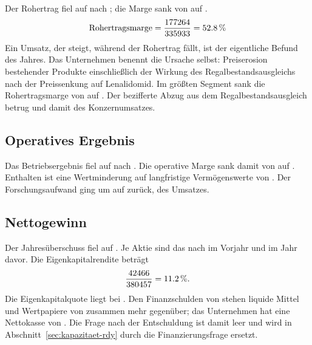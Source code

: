 Der Rohertrag fiel auf \MioINR{\RdyRohertragXXVI} nach
\MioINR{\RdyRohertragXXV}; die Marge sank von \Pct{\RdyRohertragsmargeVJ} auf
\Pct{\RdyRohertragsmarge}.
\[
  \text{Rohertragsmarge} = \frac{\RdyRohertragXXVI}{\RdyUmsatzXXVI}
  = \Pct{\RdyRohertragsmarge}
\]
Ein Umsatz, der steigt, w\"ahrend der Rohertrag f\"allt, ist der eigentliche
Befund des Jahres. Das Unternehmen benennt die Ursache selbst: Preiserosion
bestehender Produkte einschlie{\ss}lich der Wirkung des
Regalbestandsausgleichs nach der Preissenkung auf
Lenalidomid.
Im gr\"o{\ss}ten Segment sank die Rohertragsmarge von
\Pct{\RdyRohertragGgMargeVJ} auf \Pct{\RdyRohertragGgMarge}.
Der bezifferte Abzug aus dem Regalbestandsausgleich betrug
\MioINR{\RdySsaEffekt} und damit \Pct{\RdySsaAnteil} des
Konzernumsatzes.

\subsection{Operatives Ergebnis}

Das Betriebsergebnis fiel \PctBetrag{\RdyBetriebsergebnisWachstum} auf
\MioINR{\RdyBetriebsergebnis} nach
\MioINR{\RdyBetriebsergebnisVJ}.
Die operative Marge sank damit von \Pct{\RdyBetriebsMargeVJ} auf
\Pct{\RdyBetriebsMarge}. Enthalten ist eine Wertminderung auf langfristige
Verm\"ogenswerte von \MioINR{\RdyWertminderung}.
Der Forschungsaufwand ging um \PctBetrag{\RdyForschungWachstum} auf
\MioINR{\RdyForschungXXVI} zur\"uck, \Pct{\RdyForschungsquote} des
Umsatzes.

\subsection{Nettogewinn}

Der Jahres\"uberschuss fiel \PctBetrag{\RdyErgebnisWachstum} auf
\MioINR{\RdyJahresueberschussXXVI}.
Je Aktie sind das \INRje{\RdyErgebnisJeAktie} nach
\INRje{\RdyErgebnisJeAktieVJ} im Vorjahr und
\INRje{\RdyErgebnisJeAktieVVJ} im Jahr davor.
Die Eigenkapitalrendite betr\"agt
\[
  \frac{\RdyJahresueberschussXXVI}{\RdyEigenkapital} = \Pct{\RdyEigenkapitalrendite}.
\]
Die Eigenkapitalquote liegt bei \Pct{\RdyEigenkapitalquote}. Den
Finanzschulden von \MioINR{\RdyFinanzschulden} stehen liquide Mittel und
Wertpapiere von zusammen mehr gegen\"uber; das Unternehmen hat eine Nettokasse
von \MioINR{\RdyNettokasse}.
Die Frage nach der Entschuldung ist damit leer und wird in
Abschnitt~\ref{sec:kapazitaet-rdy} durch die Finanzierungsfrage ersetzt.

